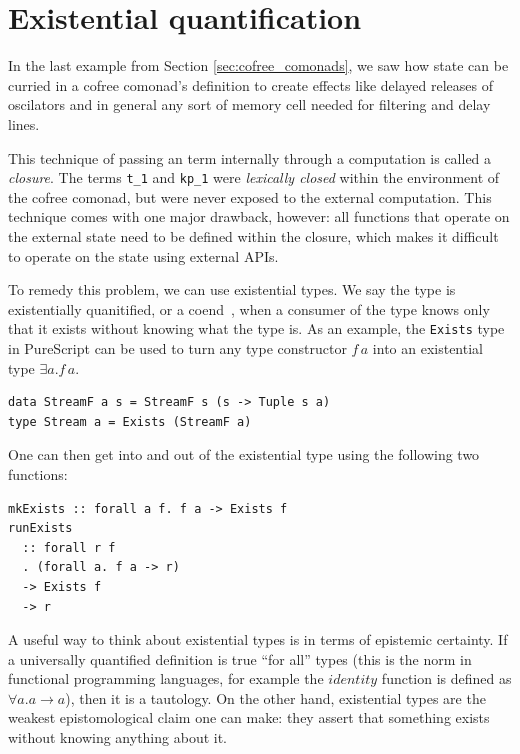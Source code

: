 \documentclass{article}
\begin{document}
\section{Existential quantification}
\label{sec:existential_quantification}

In the last example from Section \ref{sec:cofree_comonads}, we saw how state can be curried in a cofree comonad's definition to create effects like delayed releases of oscilators and in general any sort of memory cell needed for filtering and delay lines.

This technique of passing an term internally through a computation is called a \textit{closure}. The terms \texttt{t\_1} and \texttt{kp\_1} were \textit{lexically closed} within the environment of the cofree comonad, but were never exposed to the external computation.  This technique comes with one major drawback, however: all functions that operate on the external state need to be defined within the closure, which makes it difficult to operate on the state using external APIs.

To remedy this problem, we can use existential types. We say the type is existentially quanitified, or a coend~\cite{yoneda1960ext}, when a consumer of the type knows only that it exists without knowing what the type is. As an example, the \texttt{Exists} type in PureScript can be used to turn any type constructor $f\,a$ into an existential type $\exists a. f\,a$.

\lstset{language=Haskell, style=psstyle}
\begin{lstlisting}
data StreamF a s = StreamF s (s -> Tuple s a)
type Stream a = Exists (StreamF a)
\end{lstlisting}

One can then get into and out of the existential type using the following two functions:

\lstset{language=Haskell, style=psstyle}
\begin{lstlisting}
mkExists :: forall a f. f a -> Exists f
runExists
  :: forall r f
  . (forall a. f a -> r)
  -> Exists f
  -> r
\end{lstlisting}

A useful way to think about existential types is in terms of epistemic certainty. If a universally quantified definition is true ``for all'' types (this is the norm in functional programming languages, for example the $identity$ function is defined as $\forall a. a \rightarrow a$), then it is a tautology. On the other hand, existential types are the weakest epistomological claim one can make: they assert that something exists without knowing anything about it.
\end{document}
